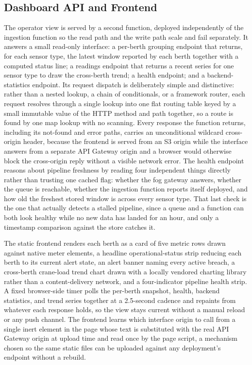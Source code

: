 \documentclass[conference]{IEEEtran}
\begin{document}
\subsection{Dashboard API and Frontend}

The operator view is served by a second function, deployed independently of the ingestion function so the read path and the write path scale and fail separately. It answers a small read-only interface: a per-berth grouping endpoint that returns, for each sensor type, the latest window reported by each berth together with a computed status line; a readings endpoint that returns a recent series for one sensor type to draw the cross-berth trend; a health endpoint; and a backend-statistics endpoint. Its request dispatch is deliberately simple and distinctive: rather than a nested lookup, a chain of conditionals, or a framework router, each request resolves through a single lookup into one flat routing table keyed by a small immutable value of the HTTP method and path together, so a route is found by one map lookup with no scanning. Every response the function returns, including its not-found and error paths, carries an unconditional wildcard cross-origin header, because the frontend is served from an S3 origin while the interface answers from a separate API Gateway origin and a browser would otherwise block the cross-origin reply without a visible network error. The health endpoint reasons about pipeline freshness by reading four independent things directly rather than trusting one cached flag: whether the fog gateway answers, whether the queue is reachable, whether the ingestion function reports itself deployed, and how old the freshest stored window is across every sensor type. That last check is the one that actually detects a stalled pipeline, since a queue and a function can both look healthy while no new data has landed for an hour, and only a timestamp comparison against the store catches it.

The static frontend renders each berth as a card of five metric rows drawn against native meter elements, a headline operational-status strip reducing each berth to its current alert state, an alert banner naming every active breach, a cross-berth crane-load trend chart drawn with a locally vendored charting library rather than a content-delivery network, and a four-indicator pipeline health strip. A fixed browser-side timer polls the per-berth snapshot, health, backend statistics, and trend series together at a 2.5-second cadence and repaints from whatever each response holds, so the view stays current without a manual reload or any push channel. The frontend learns which interface origin to call from a single inert element in the page whose text is substituted with the real API Gateway origin at upload time and read once by the page script, a mechanism chosen so the same static files can be uploaded against any deployment's endpoint without a rebuild.
\end{document}
